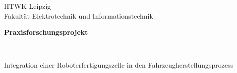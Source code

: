 

	\addchap*{\hspace*{4.2cm} {\huge Abschlussbericht}}
	\thispagestyle{empty}
	\vspace*{-5.3cm}
	HTWK Leipzig \\
	Fakultät Elektrotechnik und Informationstechnik \\

	\vspace*{-2cm}%
	\par
	\vspace*{3.5cm}%
	\begin{center}
		\vspace*{0.3cm}%
	\textbf{Praxisforschungsprojekt}\\
	\end{center}
	\ \\
	\vspace*{1cm}%
	\begin{center}
	\LARGE{Integration einer Roboterfertigungszelle in den Fahrzeugherstellungsprozess}
	\end{center}
	\vspace*{3cm}%
